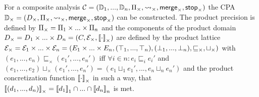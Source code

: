 For a composite analysis $\mathcal{C} = (\mathbb{D}_1, ..., \mathbb{D}_n, \Pi_\times, \operatorname{\leadsto}_\times, \operatorname{\mathsf{merge}}_\times, \operatorname{\mathsf{stop}}_\times)$ the CPA $\mathbb{D}_\times = (D_\times, \Pi_\times, \operatorname{\leadsto}_\times, \operatorname{\mathsf{merge}}_\times, \operatorname{\mathsf{stop}}_\times)$ can be constructed. The product precision is defined by $\Pi_\times = \Pi_1 \times ... \times \Pi_n$ and the components of the product domain $D_\times = D_1 \times ... \times D_n = (C, \mathcal{E}_\times, \left\llbracket \cdot \right\rrbracket_\times)$ are defined by the product lattice
$\mathcal{E}_\times = \mathcal{E}_1 \times ... \times \mathcal{E}_n = (E_1 \times ... \times E_n, (\top_1, ..., \top_n), (\bot_1, ..., \bot_n), \sqsubseteq_\times, \sqcup_\times)$ with $(e_1, ..., e_n) \sqsubseteq_\times (e_1', ..., e_n')$ iff $\forall i \in n:  e_i \sqsubseteq_i e_i'$ and$ (e_1, ..., e_2) \sqcup_\times (e_1', ..., e_n') = (e_1 \sqcup_1 e_1', ..., e_n \sqcup_n e_n')$
 and the product concretization function $\left\llbracket \cdot \right\rrbracket_\times$ in such a way, that
  $\left\llbracket (d_1, ..., d_n) \right\rrbracket_\times = \left\llbracket d_1 \right\rrbracket_1 \cap ... \cap \left\llbracket d_n \right\rrbracket_n$ is met.
